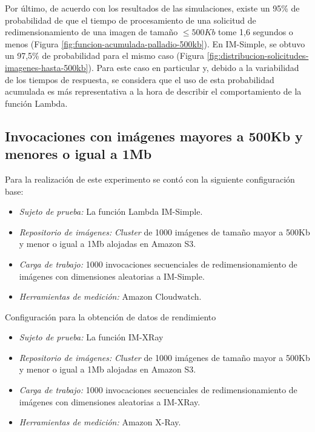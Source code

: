 Por último, de acuerdo con los resultados de las simulaciones, existe un 95\% de probabilidad de que el tiempo de procesamiento de una solicitud de redimensionamiento de una imagen de tamaño $\leq 500Kb$ tome 1,6 segundos o menos (Figura \ref{fig:funcion-acumulada-palladio-500kb}). En IM-Simple, se obtuvo un 97,5\% de probabilidad para el mismo caso (Figura \ref{fig:distribucion-solicitudes-imagenes-hasta-500kb}). Para este caso en particular y, debido a la variabilidad de los tiempos de respuesta, se considera que el uso de esta probabilidad acumulada es más representativa a la hora de describir el comportamiento de la función Lambda.


\subsection{Invocaciones con imágenes mayores a 500Kb y menores o igual a 1Mb}
Para la realización de este experimento se contó con la siguiente configuración base:
\begin{itemize}
    \item \emph{Sujeto de prueba:} La función Lambda IM-Simple.
    \item \emph{Repositorio de imágenes:} \emph{Cluster} de 1000 imágenes de tamaño mayor a 500Kb y menor o igual a 1Mb alojadas en Amazon S3.     
    \item \emph{Carga de trabajo:} 1000 invocaciones secuenciales de redimensionamiento de imágenes con dimensiones aleatorias a IM-Simple.
    \item \emph{Herramientas de medición:} Amazon Cloudwatch.
\end{itemize}

Configuración para la obtención de datos de rendimiento

\begin{itemize}
    \item \emph{Sujeto de prueba:} La función IM-XRay
    \item \emph{Repositorio de imágenes:} \emph{Cluster} de 1000 imágenes de tamaño mayor a 500Kb y menor o igual a 1Mb alojadas en Amazon S3.     
    \item \emph{Carga de trabajo:} 1000 invocaciones secuenciales de redimensionamiento de imágenes con dimensiones aleatorias a IM-XRay.
    \item \emph{Herramientas de medición:} Amazon X-Ray.
\end{itemize}

